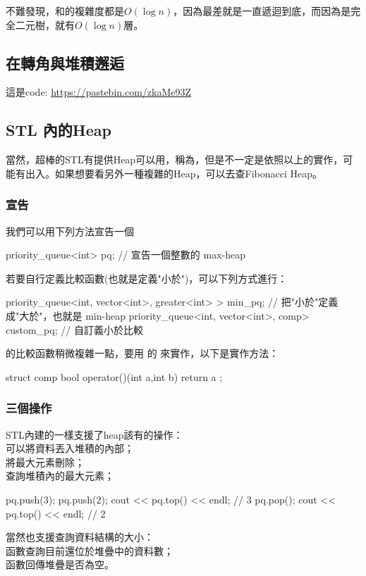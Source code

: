 \documentclass[main.tex]{subfiles}
\begin{document}
不難發現，和的複雜度都是$O(\log n)$，因為最差就是一直遞迴到底，而因為是完全二元樹，就有$O(\log n)$層。
\subsection{在轉角與堆積邂逅}
這是code: \url{https://pastebin.com/zkaMe93Z}
\subsection{STL 內的Heap}
當然，超棒的STL有提供Heap可以用，稱為，但是不一定是依照以上的實作，可能有出入。如果想要看另外一種複雜的Heap，可以去查Fibonacci Heap。
\subsubsection{宣告}
我們可以用下列方法宣告一個
 \begin{C++}
priority_queue<int> pq; // 宣告一個整數的 max-heap
 \end{C++}
\indent\indent 若要自行定義比較函數(也就是定義"小於")，可以下列方式進行：
 \begin{C++}
priority_queue<int, vector<int>, greater<int> > min_pq;
// 把"小於"定義成"大於"，也就是 min-heap
priority_queue<int, vector<int>, comp> custom_pq; 
// 自訂義小於比較
 \end{C++}
\indent\indent{}的比較函數稍微複雜一點，要用  的  來實作，以下是實作方法：
\begin{C++}
struct comp{
    bool operator()(int a,int b){
        return a%
    }
};
\end{C++}
\subsubsection{三個操作}
STL內建的一樣支援了heap該有的操作：\\
\indent{}  可以將資料丟入堆積的內部；\\
\indent{} 將最大元素刪除；\\
\indent{} 查詢堆積內的最大元素；\\
\begin{C++}
pq.push(3);
pq.push(2);
cout << pq.top() << endl; // 3
pq.pop();
cout << pq.top() << endl; // 2
\end{C++}
\indent\indent 當然也支援查詢資料結構的大小：\\
\indent{} 函數查詢目前還位於堆疊中的資料數；\\
\indent{} 函數回傳堆疊是否為空。
\end{document}
